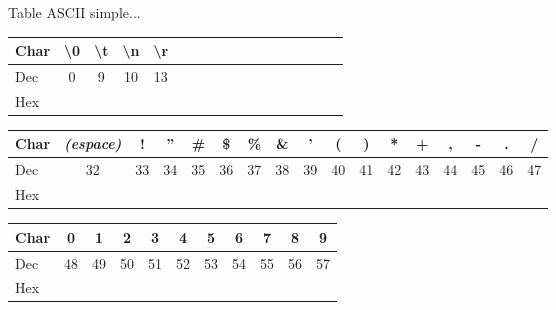\documentclass[11pt,a4paper]{article}
\begin{document}

\fancyhf{} %
\renewcommand{\headrulewidth}{0pt}
\renewcommand{\footrulewidth}{0pt}


\begin{center}
\begin{LARGE}
Table ASCII \og simple... \fg{}
\end{LARGE}
\end{center}


\vfillFirst

\begin{center}

\begin{tabular}{ | l |c|c|c|c|c| c |c|c|c|c|c|c|c|c|c|c| }
\hline
Char & \textbackslash{}0 & \textbackslash{}t & \textbackslash{}n & \textbackslash{}r \\
\hline
Dec &          0         &        9          &         10        &        13         \\
\hline
Hex &                    &                   &                   &                   \\
\hline
\end{tabular}

\vspace*{1cm}

\begin{tabular}{ | l |c|c|c|c|c|c|c|c|c|c|c|c|c|c|c|c| }
\hline
Char & \textit{(espace)} &  ! & '' & \# & \$ & \% & \& &  ' &  ( &  ) &  * &  + &  , &  - &  . &  / \\
\hline
Dec &        32          & 33 & 34 & 35 & 36 & 37 & 38 & 39 & 40 & 41 & 42 & 43 & 44 & 45 & 46 & 47 \\
\hline
Hex &                    &    &    &    &    &    &    &    &    &    &    &    &    &    &    &    \\
\hline
\end{tabular}

\vspace*{1cm}

\begin{tabular}{ | l |c|c|c|c|c|c|c|c|c|c| }
\hline
Char & 0 &  1 &  2 &  3 &  4 &  5 &  6 &  7 &  8 &  9 \\
\hline
Dec & 48 & 49 & 50 & 51 & 52 & 53 & 54 & 55 & 56 & 57 \\
\hline
Hex &    &    &    &    &    &    &    &    &    & \\
\hline
\end{tabular}


\end{center}
\end{document}
